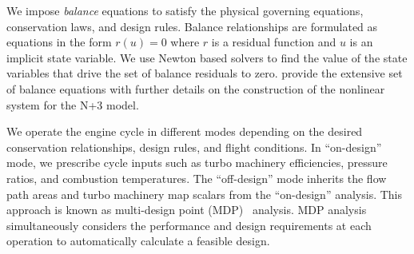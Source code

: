 \documentclass[conf]{new-aiaa}
\begin{document}
We impose \emph{balance} equations to satisfy the physical governing equations, conservation laws, and design rules.
Balance relationships are formulated as equations in the form $r(u)=0$ where $r$ is a residual function and $u$ is an implicit state variable.
We use Newton based solvers to find the value of the state variables that drive the set of balance residuals to zero.
\citeauthor{Hendricks2019} provide the extensive set of balance equations with further details on the construction of the nonlinear system for the N+3 model.

We operate the engine cycle in different modes depending on the desired conservation relationships, design rules, and flight conditions.
In ``on-design'' mode, we prescribe cycle inputs such as turbo machinery efficiencies, pressure ratios, and combustion temperatures.
The ``off-design'' mode inherits the flow path areas and turbo machinery map scalars from the ``on-design'' analysis.
This approach is known as multi-design point (MDP)~\cite{Schutte2009} analysis.
MDP analysis simultaneously considers the performance and design requirements at each operation to automatically calculate a feasible design.
\end{document}
